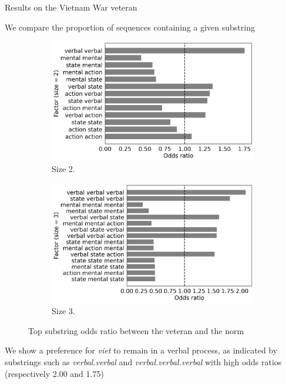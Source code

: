 \documentclass[handout,10pt]{beamer}
\begin{document}
\begin{frame}{Results on the Vietnam War veteran}

We compare the proportion of sequences containing a given substring

\pause

\begin{figure}[!htb]
     \begin{subfigure}[b]{0.5\textwidth}
         \centering
         \includegraphics[scale=0.2]{img/viet_odds_2.png}
         \caption{Size 2.}
         \label{fig:viet_odds2}
     \end{subfigure}
         \begin{subfigure}[b]{0.4\textwidth}
         \centering
         \includegraphics[scale=0.2]{img/viet_odds_3.png}
         \caption{Size 3.}
         \label{fig:viet_odds3}
     \end{subfigure}
        \caption{Top substring odds ratio between the veteran and the norm}
        \label{fig:viet_odds}
\end{figure}

\pause


We show a preference for \textit{viet} to remain in a verbal process, as indicated by substrings such as \textit{verbal.verbal} and \textit{verbal.verbal.verbal} with high odds ratios (respectively 2.00 and 1.75)

\end{frame}
\end{document}
